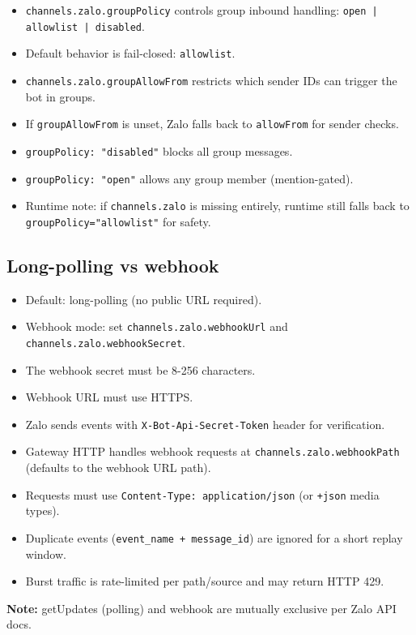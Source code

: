 \begin{itemize}
  \item \texttt{channels.zalo.groupPolicy} controls group inbound handling: \texttt{open | allowlist | disabled}.
  \item Default behavior is fail-closed: \texttt{allowlist}.
  \item \texttt{channels.zalo.groupAllowFrom} restricts which sender IDs can trigger the bot in groups.
  \item If \texttt{groupAllowFrom} is unset, Zalo falls back to \texttt{allowFrom} for sender checks.
  \item \texttt{groupPolicy: "disabled"} blocks all group messages.
  \item \texttt{groupPolicy: "open"} allows any group member (mention-gated).
  \item Runtime note: if \texttt{channels.zalo} is missing entirely, runtime still falls back to \texttt{groupPolicy="allowlist"} for safety.
\end{itemize}


\subsection{Long-polling vs webhook}


\begin{itemize}
  \item Default: long-polling (no public URL required).
  \item Webhook mode: set \texttt{channels.zalo.webhookUrl} and \texttt{channels.zalo.webhookSecret}.
  \item The webhook secret must be 8-256 characters.
  \item Webhook URL must use HTTPS.
  \item Zalo sends events with \texttt{X-Bot-Api-Secret-Token} header for verification.
  \item Gateway HTTP handles webhook requests at \texttt{channels.zalo.webhookPath} (defaults to the webhook URL path).
  \item Requests must use \texttt{Content-Type: application/json} (or \texttt{+json} media types).
  \item Duplicate events (\texttt{event\_name + message\_id}) are ignored for a short replay window.
  \item Burst traffic is rate-limited per path/source and may return HTTP 429.
\end{itemize}


\textbf{Note:} getUpdates (polling) and webhook are mutually exclusive per Zalo API docs.


